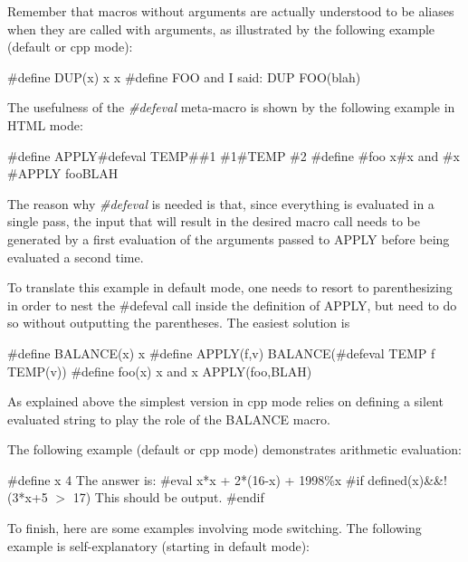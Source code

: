 Remember that macros without arguments are actually understood to be aliases
when they are called with arguments, as illustrated by the following example
(default or cpp mode): 

\begin{PRE}
  \#define DUP(x) x x
  \#define FOO and I said: DUP
  FOO(blah)
\end{PRE}

The usefulness of the {\it \#defeval} meta-macro is shown by the following
example in HTML mode: 

\begin{PRE}
  {\htmlLt}\#define APPLY{\htmlBar}{\htmlLt}\#defeval TEMP{\htmlBar}{\htmlLt}{\htmlBackslash}\#\#1 {\htmlBackslash}\#1{\htmlGt}{\htmlGt}{\htmlLt}\#TEMP \#2{\htmlGt}{\htmlGt}
  {\htmlLt}\#define {\htmlLt}\#foo x{\htmlGt}{\htmlBar}{\htmlLt}\#x{\htmlGt} and {\htmlLt}\#x{\htmlGt}{\htmlGt}
  {\htmlLt}\#APPLY foo{\htmlBar}BLAH{\htmlGt}
\end{PRE}

The reason why {\it \#defeval} is needed is that, since everything is
evaluated in a single pass, the input that will result in the desired macro
call needs to be generated by a first evaluation of the arguments passed to
APPLY before being evaluated a second time. 

To translate this example in default mode, one needs to resort to
parenthesizing in order to nest the \#defeval call inside the definition of
APPLY, but need to do so without outputting the parentheses. The easiest
solution is 

\begin{PRE}
  \#define BALANCE(x) x
  \#define APPLY(f,v) BALANCE(\#defeval TEMP f
  TEMP(v))
  \#define foo(x) x and x
  APPLY({\htmlBackslash}foo,BLAH)
\end{PRE}

As explained above the simplest version in cpp mode relies on defining a
silent evaluated string to play the role of the BALANCE macro. 

The following example (default or cpp mode) demonstrates arithmetic
evaluation: 

\begin{PRE}
  \#define x 4
  The answer is:
  \#eval x*x + 2*(16-x) + 1998\%x
  \#if defined(x)\&\&!(3*x+5 $>$ 17)
  This should be output.
  \#endif
\end{PRE}

To finish, here are some examples involving mode switching. The following
example is self-explanatory (starting in default mode): 

